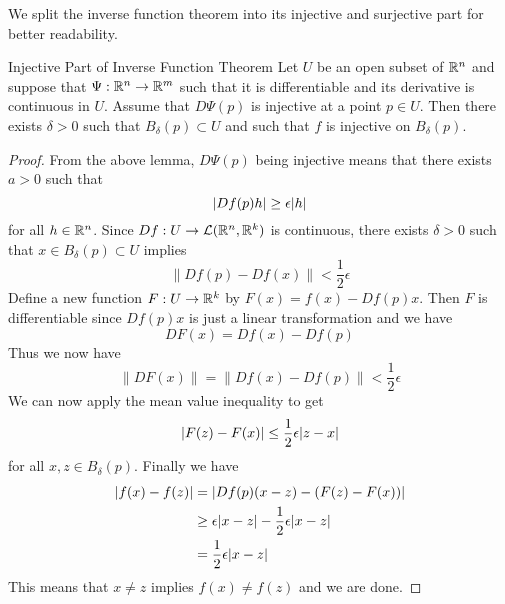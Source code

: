 \documentclass[a4paper]{article}
\begin{document}
We split the inverse function theorem into its injective and surjective part for better readability. 

\begin{prp}{Injective Part of Inverse Function Theorem}{} Let $U$ be an open subset of $\mathbb{R}^n$ and suppose that $\Psi:\mathbb{R}^n\to\mathbb{R}^m$ such that it is differentiable and its derivative is continuous in $U$. Assume that $D\Psi(p)$ is injective at a point $p\in U$. Then there exists $\delta>0$ such that $B_\delta(p)\subset U$ and such that $f$ is injective on $B_\delta(p)$. 
\begin{proof}
From the above lemma, $D\Psi(p)$ being injective means that there exists $a>0$ such that $$\abs{Df(p)h}\geq\epsilon\abs{h}$$ for all $h\in\mathbb{R}^n$. Since $Df:U\to\mathcal{L}(\mathbb{R}^n,\mathbb{R}^k)$ is continuous, there exists $\delta>0$ such that $x\in B_\delta(p)\subset U$ implies $$\|Df(p)-Df(x)\|<\frac{1}{2}\epsilon$$ Define a new function $F:U\to\mathbb{R}^k$ by $F(x)=f(x)-Df(p)x$. Then $F$ is differentiable since $Df(p)x$ is just a linear transformation and we have $$DF(x)=Df(x)-Df(p)$$ Thus we now have $$\|DF(x)\|=\|Df(x)-Df(p)\|<\frac{1}{2}\epsilon$$ We can now apply the mean value inequality to get $$\abs{F(z)-F(x)}\leq\frac{1}{2}\epsilon\abs{z-x}$$ for all $x,z\in B_\delta(p)$. Finally we have 
\begin{align*}
\abs{f(x)-f(z)}&=\abs{Df(p)(x-z)-(F(z)-F(x))}\\
&\geq\epsilon\abs{x-z}-\frac{1}{2}\epsilon\abs{x-z}\\
&=\frac{1}{2}\epsilon\abs{x-z}
\end{align*}
This means that $x\neq z$ implies $f(x)\neq f(z)$ and we are done. 
\end{proof}
\end{prp}
\end{document}
